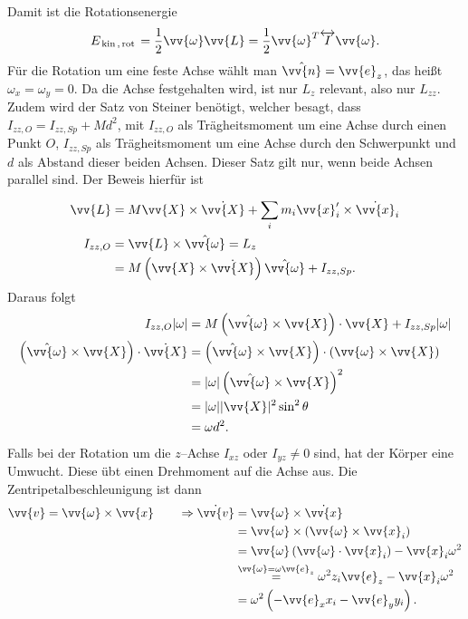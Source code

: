 \documentclass[a4paper,12pt]{article}
\numberwithin{equation}{section}
\begin{document}
Damit ist die Rotationsenergie
\[ 
        E_{\,\text{kin}\,,\,\text{rot}\,}=\dfrac{1}{2}\vv{\omega }\vv{L}=\dfrac{1}{2}\vv{\omega }^T\overleftrightarrow{I}\vv{\omega }
.\] 
\indent Für die Rotation um eine feste Achse wählt man $\hat{\vv{n}}=\vv{e}_z$, das heißt $\omega _x=\omega _y=0$. Da die Achse festgehalten wird, ist nur $L_z$ relevant, also nur $L_{zz}$. Zudem wird der Satz von Steiner benötigt, welcher besagt, dass $I_{zz,O}=I_{zz,Sp}+Md^2$, mit $I_{zz,O}$ als Trägheitsmoment um eine Achse durch einen Punkt $O$, $I_{zz,Sp}$ als Trägheitsmoment um eine Achse durch den Schwerpunkt und $d$ als Abstand dieser beiden Achsen. Dieser Satz gilt nur, wenn beide Achsen parallel sind. Der Beweis hierfür ist
\begin{align*}
        \vv{L}&=M\vv{X}\times \dot{\vv{X}}+\sum_{i}^{}m_i\vv{x}_i'\times \dot{\vv{x}}_i\\
        I_{zz,O}&=\vv{L}\times \hat{\vv{\omega }}=L_z\\
                &=M\left(\vv{X}\times \dot{\vv{X}}\right)\hat{\vv{\omega }}+I_{zz,Sp}
.\end{align*}
Daraus folgt
\begin{align*}
        I_{zz,O}|\omega |&=M\left(\hat{\vv{\omega }}\times \vv{X}\right)\cdot \vv{X}+I_{zz,Sp}|\omega |\\
        \left(\hat{\vv{\omega }}\times \vv{X}\right)\cdot \dot{\vv{X}}&=\left(\hat{\vv{\omega }}\times \vv{X}\right)\cdot \left(\vv{\omega }\times \vv{X}\right)\\
                                                                      &=|\omega |\left(\hat{\vv{\omega }}\times \vv{X}\right)^2\\
                                                                      &=|\omega | |\vv{X}|^2\sin ^2 \theta \\
                                                                      &=\omega d^2
.\end{align*}
\indent Falls bei der Rotation um die $z$--Achse $I_{xz}$ oder $I_{yz}\neq 0$ sind, hat der Körper eine Umwucht. Diese übt einen Drehmoment auf die Achse aus. Die Zentripetalbeschleunigung ist dann
\begin{align*}
        \vv{v}=\vv{\omega }\times \vv{x}\qquad \Rightarrow \dot{\vv{v}}&=\vv{\omega }\times \dot{\vv{x}}\\
                                                                       &=\vv{\omega }\times \left(\vv{\omega }\times \vv{x}_i\right)\\
                                                                       &=\vv{\omega }\left(\vv{\omega }\cdot \vv{x}_i\right)-\vv{x}_i\omega ^2\\
                                                                       &\stackrel{\vv{\omega }=\omega \vv{e}_z}{=}\omega ^2z_i\vv{e}_z-\vv{x}_i\omega ^2\\
                                                                       &=\omega ^2\left(-\vv{e}_xx_i-\vv{e}_yy_i\right)
.\end{align*}
\end{document}
